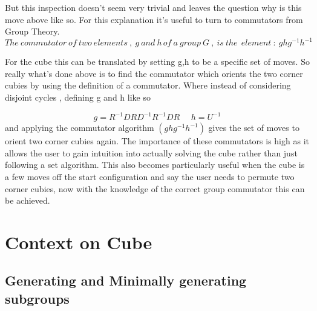 \documentclass{article}
\begin{document}
But this inspection doesn't seem very trivial and leaves the question why is this move above like so. For this explanation it's useful to turn to commutators from Group Theory. 
\begin{equation}
The\ commutator\ of\ two\ elements\ ,\ g\ and\ h\, of\ a\ group\ G\ ,\ is\ the\ \ element\ :\ ghg^{-1}h^{-1}
\end{equation}

For the cube this can be translated by setting g,h to be a specific set of moves. So really what's done above is to find the commutator which orients the two corner cubies by using the definition of a commutator. Where instead of considering disjoint cycles , defining g and h like so

\begin{equation}\label{orient}
	g = R^{-1}DRD^{-1}R^{-1}DR\ \ \ \ \ \ 
    h = U^{-1}
\end{equation}
and applying the commutator algorithm $(ghg^{-1}h^{-1})$ gives the set of moves to orient two corner cubies again. The importance of these commutators is high as it allows the user to gain intuition into actually solving the cube rather than just following a set algorithm. This also becomes particularly useful when the cube is a few moves off the start configuration and say the user needs to permute two corner cubies, now with the knowledge of the correct group commutator this can be achieved.



\section{Context on Cube}
\subsection{Generating and Minimally generating subgroups}
\end{document}
